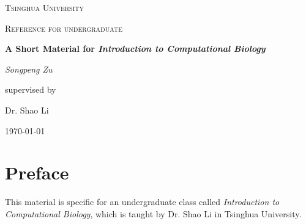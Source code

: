 \documentclass[12pt,a4paper]{book}\usepackage[]{graphicx}\usepackage[]{color}
\begin{document}
\begin{titlepage}
        \centering
        {\scshape\LARGE Tsinghua University \par}
        \vspace{1cm}
        {\scshape\Large Reference for undergraduate\par}
        \vspace{1.5cm}
        {\huge\bfseries A Short Material for \textit{Introduction to Computational Biology}\par}
        \vspace{2cm}
        {\Large\itshape Songpeng Zu\par}
        \vfill
        supervised by\par
        Dr. Shao Li
        \vfill
        {\large \today\par}
\end{titlepage}
\chapter*{Preface}
This material is specific for an undergraduate class called {\it Introduction to Computational Biology}, which is taught by Dr. Shao Li
in Tsinghua University.
\end{document}
